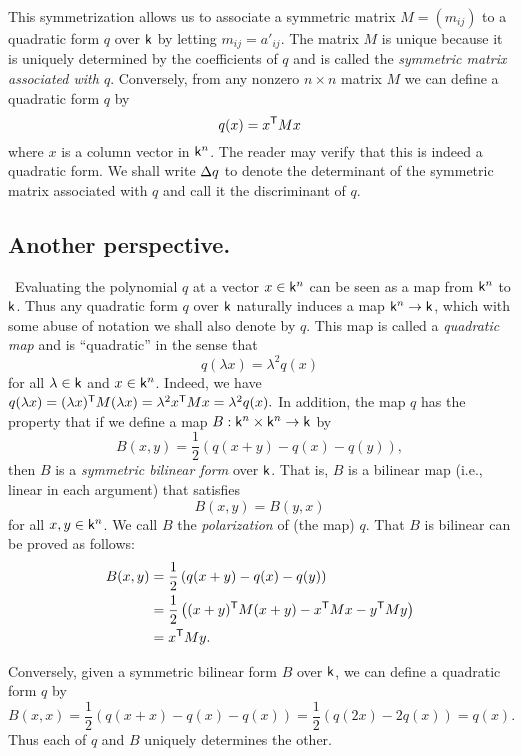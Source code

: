 This symmetrization allows us to associate a symmetric matrix \(M = (m_{ij})\)
to a quadratic form \(q\) over \(\mathsf{k}\) by letting \(m_{ij} = a'_{ij}\). The
matrix \(M\) is unique because it is uniquely determined by the coefficients of
\(q\) and is called the \emph{symmetric matrix associated with \(q\)}.
Conversely, from any nonzero \(n \times n\) matrix \(M\) we can define a
quadratic form \(q\) by
\[
  q(x) = x^{\mathsf{T}}Mx
\]
where \(x\) is a column vector in \(\mathsf{k}^n\). The reader may verify that this
is indeed a quadratic form. We shall write \({\Delta} q\) to denote the
determinant of the symmetric matrix associated with \(q\) and call it the
discriminant of \(q\).\label{sec:quadratic-forms-matrix-representation}

\subsection{Another perspective.}~Evaluating the polynomial \(q\) at a vector
\(x \in \mathsf{k}^n\) can be seen as a map from \(\mathsf{k}^n\) to \(\mathsf{k}\). Thus
any quadratic form \(q\) over \(\mathsf{k}\) naturally induces a map \(\mathsf{k}^n \to
\mathsf{k}\), which with some abuse of notation we shall also denote by \(q\). This
map is called a \emph{quadratic map} and is ``quadratic'' in the sense
that\label{sec:quadratic-maps}
\[q(\lambda x) = \lambda^2q(x)\] for all \(\lambda \in \mathsf{k}\) and \(x \in
\mathsf{k}^n\). Indeed, we have \(q(\lambda x) = (\lambda x)^{\mathsf{T}}M(\lambda x)
= \lambda^2 x^{\mathsf{T}}Mx = \lambda^2 q(x).\) In addition, the map \(q\) has the
property that if we define a map \(B : \mathsf{k}^n \times \mathsf{k}^n \to \mathsf{k}\) by
\[
  B(x, y) = \frac{1}{2}\left(q(x+y) - q(x) - q(y)\right),
\]
then \(B\) is a \emph{symmetric bilinear form} over \(\mathsf{k}\). That is, \(B\)
is a bilinear map (i.e., linear in each argument) that satisfies
\[
  B(x, y) = B(y, x)
\]
for all \(x, y \in \mathsf{k}^n\). We call \(B\) the \emph{polarization} of (the
map) \(q\). That \(B\) is bilinear can be proved as follows:
\begin{align*}
  B(x,y) &= \frac{1}{2}\left(q(x+y) - q(x) - q(y)\right)\\
  &= \frac{1}{2}\left( (x+y)^{\mathsf{T}}M(x+y) - x^{\mathsf{T}}Mx - y^{\mathsf{T}}My \right)\\
  &= x^{\mathsf{T}}My.
\end{align*}

Conversely, given a symmetric bilinear form \(B\) over \(\mathsf{k}\), we can define
a quadratic form \(q\) by
\[B(x, x) = \frac{1}{2}\left(q(x+x) - q(x) - q(x)\right) =\frac{1}{2}\left(q(2x)
- 2q(x)\right) = q(x).\] Thus each of \(q\) and \(B\) uniquely determines the
other.

